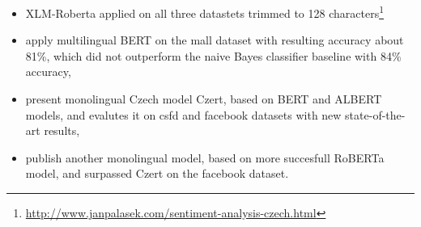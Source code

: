 \begin{itemize}
\item XLM-Roberta applied on all three datastets trimmed to 128 characters\footnote{\url{http://www.janpalasek.com/sentiment-analysis-czech.html}}
\item \citet{Klouda} apply multilingual BERT on the mall dataset with resulting accuracy about  81\%, which did not outperform the naive Bayes classifier baseline with 84\% accuracy, 
\item  \citet{Sido2021} present monolingual Czech model Czert,  based on BERT and ALBERT models, and evalutes it on csfd and facebook datasets with new state-of-the-art results,
\item \citet{Straka2021} publish another monolingual model, based on more succesfull RoBERTa model, and surpassed Czert on the facebook dataset.
\end{itemize}

